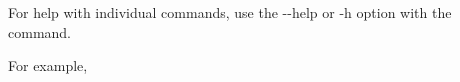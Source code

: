 For help with individual commands, use the {\ttfamily -\/-\/help} or {\ttfamily -\/h} option with the command.

For example,


\begin{DoxyCode}{0}

\end{DoxyCode}
 